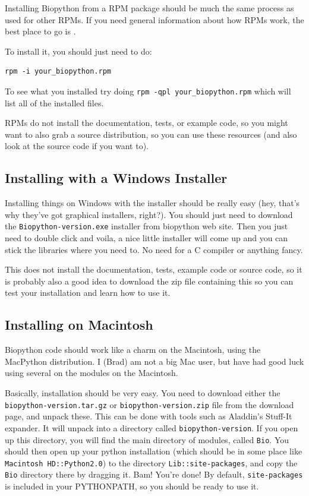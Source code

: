 \documentclass{report}
\begin{document}
Installing Biopython from a RPM package should be much the same process as used for other RPMs. If you need general information about how RPMs work, the best place to go is .


To install it, you should just need to do:

\begin{verbatim}
rpm -i your_biopython.rpm
\end{verbatim}

To see what you installed try doing \verb|rpm -qpl your_biopython.rpm| which will list all of the installed files.


RPMs do not install the documentation, tests, or example code, so you might want to also grab a source distribution, so you can use these resources (and also look at the source code if you want to).


\subsection{Installing with a Windows Installer}

Installing things on Windows with the installer should be really easy (hey, that's why they've got graphical installers, right?). You should just need to download the \verb|Biopython-version.exe| installer from biopython web site. Then you just need to double click and voila, a nice little installer will come up and you can stick the libraries where you need to. No need for a C compiler or anything fancy.


This does not install the documentation, tests, example code or source code, so it is probably also a good idea to download the zip file containing this so you can test your installation and learn how to use it.

\subsection{Installing on Macintosh}

Biopython code should work like a charm on the Macintosh, using the MacPython distribution. I (Brad) am not a big Mac user, but have had good luck using several on the modules on the Macintosh.


Basically, installation should be very easy. You need to download either the \verb|biopython-version.tar.gz| or \verb|biopython-version.zip| file from the download page, and unpack these. This can be done with tools such as Aladdin's Stuff-It expander. It will unpack into a directory called \verb|biopython-version|. If you open up this directory, you will find the main directory of modules, called \verb|Bio|. You should then open up your python installation (which should be in some place like \verb|Macintosh HD::Python2.0|) to the directory \verb|Lib::site-packages|, and copy the \verb|Bio| directory there by dragging it. Bam! You're done! By default, \verb|site-packages| is included in your PYTHONPATH, so you should be ready to use it.
\end{document}

